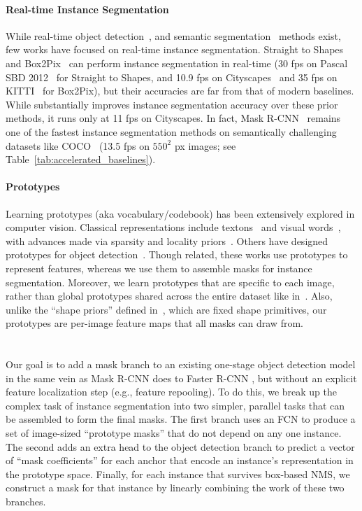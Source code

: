 \documentclass[10pt,journal,compsoc]{IEEEtran}
\begin{document}
\paragraph{Real-time Instance Segmentation}
While real-time object detection~\cite{ssd,yolov1,yolov2,yolov3}, and semantic segmentation~\cite{segnet,treml2016sq,enet,blitznet,zhao2018icnet} methods exist, few works have focused on real-time instance segmentation.  Straight to Shapes~\cite{straight2shapes} and Box2Pix~\cite{box2pix} can perform instance segmentation in real-time (30 fps on Pascal SBD 2012~\cite{pascalvoc,sbd} for Straight to Shapes, and 10.9 fps on Cityscapes~\cite{cityscape} and 35 fps on KITTI~\cite{KITTI} for Box2Pix), but their accuracies are far from that of modern baselines. While \cite{neven2019instance} substantially improves instance segmentation accuracy over these prior methods, it runs only at 11 fps on Cityscapes. In fact, Mask R-CNN~\cite{maskrcnn} remains one of the fastest instance segmentation methods on semantically challenging datasets like COCO~\cite{coco} (13.5 fps on $550^2$ px images; see Table~\ref{tab:accelerated_baselines}).


\paragraph{Prototypes}
Learning prototypes (aka vocabulary/codebook) has been extensively explored in computer vision. Classical representations include textons~\cite{textons} and visual words~\cite{sivic-iccv2003}, with advances made via sparsity and locality priors~\cite{yang-tip2010,wang-cvpr2010,zhang-iccv2013}. Others have designed prototypes for object detection~\cite{agarwal-eccv2002,yu-bmvc2007,ren-cvpr2013}. Though related, these works use prototypes to represent features, whereas we use them to assemble masks for instance segmentation. Moreover, we learn prototypes that are specific to each image, rather than global prototypes shared across the entire dataset like in~\cite{arnab-cvpr2017}. Also, unlike the ``shape priors'' defined in~\cite{arnab-cvpr2017}, which are fixed shape primitives, our prototypes are per-image feature maps that all masks can draw from.

\section{\methodname}

Our goal is to add a mask branch to an existing one-stage object detection model in the same vein as Mask R-CNN \cite{maskrcnn} does to Faster R-CNN \cite{fasterrcnn}, but without an explicit feature localization step (e.g., feature repooling). To do this, we break up the complex task of instance segmentation into two simpler, parallel tasks that can be assembled to form the final masks. The first branch uses an FCN \cite{fcn} to produce a set of image-sized ``prototype masks'' that do not depend on any one instance. The second adds an extra head to the object detection branch to predict a vector of ``mask coefficients'' for each anchor that encode an instance's representation in the prototype space. Finally, for each instance that survives box-based NMS, we construct a mask for that instance by linearly combining the work of these two branches.
\end{document}
